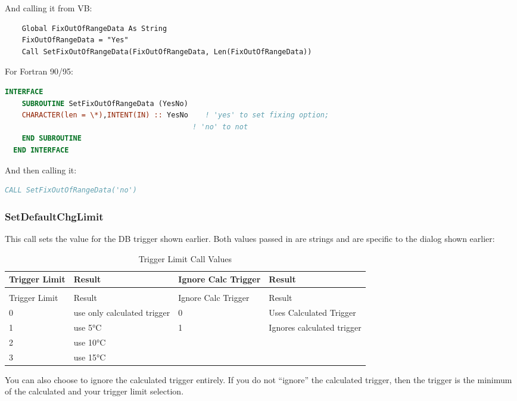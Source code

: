 And calling it from VB:

\begin{lstlisting}
    Global FixOutOfRangeData As String
    FixOutOfRangeData = "Yes"
    Call SetFixOutOfRangeData(FixOutOfRangeData, Len(FixOutOfRangeData))
\end{lstlisting}

For Fortran 90/95:

\begin{lstlisting}[language=Fortran]
  INTERFACE
    SUBROUTINE SetFixOutOfRangeData (YesNo)
    CHARACTER(len = \*),INTENT(IN) :: YesNo    ! 'yes' to set fixing option;
                                            ! 'no' to not
    END SUBROUTINE
  END INTERFACE
\end{lstlisting}

And then calling it:

\begin{lstlisting}[language=Fortran]
CALL SetFixOutOfRangeData('no')
\end{lstlisting}

\subsubsection{SetDefaultChgLimit}\label{setdefaultchglimit}

This call sets the value for the DB trigger shown earlier. Both values passed in are strings and are specific to the dialog shown earlier:

\begin{longtable}[c]{p{1.0in}p{2.0in}p{1.2in}p{1.8in}}
\caption{Trigger Limit Call Values \label{table:trigger-limit-call-values}} \tabularnewline
\toprule 
Trigger Limit & Result & Ignore Calc Trigger & Result \tabularnewline
\midrule
\endfirsthead

\caption[]{Trigger Limit Call Values} \tabularnewline
\toprule 
Trigger Limit & Result & Ignore Calc Trigger & Result \tabularnewline
\midrule
\endhead

0 & use only calculated trigger & 0 & Uses Calculated Trigger \tabularnewline
1 & use 5°C & 1 & Ignores calculated trigger \tabularnewline
2 & use 10°C &  &  \tabularnewline
3 & use 15°C &  &  \tabularnewline
\bottomrule
\end{longtable}

You can also choose to ignore the calculated trigger entirely. If you do not ``ignore'' the calculated trigger, then the trigger is the minimum of the calculated and your trigger limit selection.

